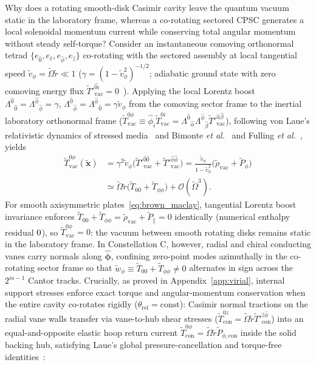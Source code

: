 \documentclass[aps,prd,twocolumn,10pt,showkeys,nofootinbib,floatfix,longbibliography]{revtex4-2}
\begin{document}
Why does a rotating smooth-disk Casimir cavity leave the quantum vacuum static in the laboratory frame, whereas a co-rotating sectored CPSC generates a local solenoidal momentum current while conserving total angular momentum without steady self-torque? Consider an instantaneous comoving orthonormal tetrad $\{e_{\hat{0}}, e_{\hat{r}}, e_{\hat{\phi}}, e_{\hat{z}}\}$ co-rotating with the sectored assembly at local tangential speed $\tilde{v}_\phi = \tilde{\Omega}\tilde{r} \ll 1$ ($\gamma = (1 - \tilde{v}_\phi^2)^{-1/2}$; adiabatic ground state with zero comoving energy flux $\tilde{T}'^{\hat{0}\hat{i}}_{\mathrm{vac}} = 0$~\cite{schaden2012arxiv}). Applying the local Lorentz boost $\Lambda^{\hat{0}}{}_{\hat{0}} = \Lambda^{\hat{\phi}}{}_{\hat{\phi}} = \gamma$, $\Lambda^{\hat{0}}{}_{\hat{\phi}} = \Lambda^{\hat{\phi}}{}_{\hat{0}} = \gamma\tilde{v}_\phi$ from the comoving sector frame to the inertial laboratory orthonormal frame ($\tilde{T}^{0\phi}_{\mathrm{vac}} \equiv \hat{\phi}_i\tilde{T}^{0i}_{\mathrm{vac}} = \Lambda^{\hat{0}}{}_{\hat{\alpha}}\Lambda^{\hat{\phi}}{}_{\hat{\beta}}\tilde{T}'^{\hat{\alpha}\hat{\beta}}_{\mathrm{vac}}$), following von Laue's relativistic dynamics of stressed media~\cite{laue1911annphys} and Bimonte \emph{et al.}~\cite{bimonte2007prd} and Fulling \emph{et al.}~\cite{fulling2007}, yields
\begin{align}
\tilde{T}^{0\phi}_{\mathrm{vac}}(\tilde{\mathbf{x}}) &= \gamma^2\tilde{v}_\phi\bigl(\tilde{T}'^{\hat{0}\hat{0}}_{\mathrm{vac}} + \tilde{T}'^{\hat{\phi}\hat{\phi}}_{\mathrm{vac}}\bigr) = \frac{\tilde{v}_\phi}{1 - \tilde{v}_\phi^2}\bigl(\tilde{\rho}_{\mathrm{vac}} + \tilde{P}_\phi\bigr) \nonumber\\
&\simeq \tilde{\Omega}\tilde{r}\bigl(\tilde{T}_{00} + \tilde{T}_{\phi\phi}\bigr) + \mathcal{O}(\tilde{\Omega}^3).
\label{eq:boost_enthalpy_current}
\end{align}
For smooth axisymmetric plates~\eqref{eq:brown_maclay}, tangential Lorentz boost invariance enforces $\tilde{T}_{00} + \tilde{T}_{\phi\phi} = \tilde{\rho}_{\mathrm{vac}} + \tilde{P}_\parallel = 0$ identically (numerical enthalpy residual $0$), so $\tilde{T}^{0\phi}_{\mathrm{vac}} = 0$: the vacuum between smooth rotating disks remains static in the laboratory frame. In Constellation C, however, radial and chiral conducting vanes carry normals along $\hat{\bm{\phi}}$, confining zero-point modes azimuthally in the co-rotating sector frame so that $\tilde{w}_\phi \equiv \tilde{T}_{00} + \tilde{T}_{\phi\phi} \neq 0$ alternates in sign across the $2^{m-1}$ Cantor tracks. Crucially, as proved in Appendix~\ref{app:virial}, internal support stresses enforce exact torque and angular-momentum conservation when the entire cavity co-rotates rigidly ($\theta_{\mathrm{rel}} = \mathrm{const}$): Casimir normal tractions on the radial vane walls transfer via vane-to-hub shear stresses ($\tilde{T}^{0z}_{\mathrm{con}} = \tilde{\Omega}\tilde{r}\tilde{T}'^{\hat{z}\hat{\phi}}_{\mathrm{con}}$) into an equal-and-opposite elastic hoop return current $\tilde{T}^{0\phi}_{\mathrm{con}} = \tilde{\Omega}\tilde{r}\tilde{P}_{\phi,\mathrm{con}}$ inside the solid backing hub, satisfying Laue's global pressure-cancellation and torque-free identities~\cite{laue1911annphys,bimonte2007prd}:
\end{document}
